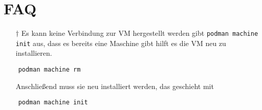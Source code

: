 \documentclass[12pt, a4paper]{article}
\begin{document}
\newpage

\section*{FAQ}
\begin{itemize}
    \item[$\dagger$] Es kann keine Verbindung zur VM hergestellt werden gibt \texttt{podman machine init}  aus, dass es bereits eine Maschine gibt hilft es die VM neu zu installieren.
\end{itemize}
\begin{verbatim}
    podman machine rm
\end{verbatim}

\begin{itemize}
    \item[] Anschließend muss sie neu installiert werden, das geschieht mit
\end{itemize}
\begin{verbatim}
    podman machine init
\end{verbatim}
\end{document}
